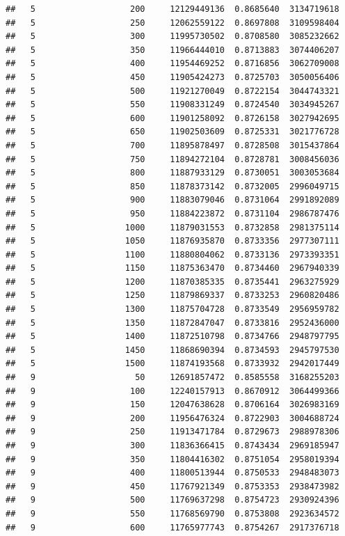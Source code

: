 \documentclass[11pt,]{article}
\begin{document}
\begin{verbatim}
##   5                   200     12129449136  0.8685640  3134719618
##   5                   250     12062559122  0.8697808  3109598404
##   5                   300     11995730502  0.8708580  3085232662
##   5                   350     11966444010  0.8713883  3074406207
##   5                   400     11954469252  0.8716856  3062709008
##   5                   450     11905424273  0.8725703  3050056406
##   5                   500     11921270049  0.8722154  3044743321
##   5                   550     11908331249  0.8724540  3034945267
##   5                   600     11901258092  0.8726158  3027942695
##   5                   650     11902503609  0.8725331  3021776728
##   5                   700     11895878497  0.8728508  3015437864
##   5                   750     11894272104  0.8728781  3008456036
##   5                   800     11887933129  0.8730051  3003053684
##   5                   850     11878373142  0.8732005  2996049715
##   5                   900     11883079046  0.8731064  2991892089
##   5                   950     11884223872  0.8731104  2986787476
##   5                  1000     11879031553  0.8732858  2981375114
##   5                  1050     11876935870  0.8733356  2977307111
##   5                  1100     11880804062  0.8733136  2973393351
##   5                  1150     11875363470  0.8734460  2967940339
##   5                  1200     11870385335  0.8735441  2963275929
##   5                  1250     11879869337  0.8733253  2960820486
##   5                  1300     11875704728  0.8733549  2956959782
##   5                  1350     11872847047  0.8733816  2952436000
##   5                  1400     11872510798  0.8734766  2948797795
##   5                  1450     11868690394  0.8734593  2945797530
##   5                  1500     11874193568  0.8733932  2942017449
##   9                    50     12691857472  0.8585558  3168255203
##   9                   100     12240157913  0.8670912  3064499366
##   9                   150     12047638628  0.8706164  3026983169
##   9                   200     11956476324  0.8722903  3004688724
##   9                   250     11913471784  0.8729673  2988978306
##   9                   300     11836366415  0.8743434  2969185947
##   9                   350     11804416302  0.8751054  2958019394
##   9                   400     11800513944  0.8750533  2948483073
##   9                   450     11767921349  0.8753353  2938473982
##   9                   500     11769637298  0.8754723  2930924396
##   9                   550     11768569790  0.8753808  2923634572
##   9                   600     11765977743  0.8754267  2917376718

\end{verbatim}
\end{document}
